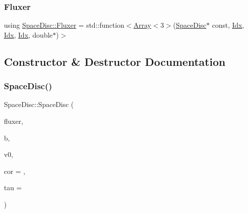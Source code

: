 \subsubsection{\texorpdfstring{Fluxer}{Fluxer}}
{\footnotesize\ttfamily using \hyperlink{structSpaceDisc_a96fbebf5dd4659e2dcc144a5debc861d}{Space\+Disc\+::\+Fluxer} =  std\+::function$<$\hyperlink{Includes_8h_abd9de33944f934950000c3929e14ad8d}{Array}$<$3$>$(\hyperlink{structSpaceDisc}{Space\+Disc}$\ast$ const, \hyperlink{Includes_8h_ae78891cd308078a2f5f9e7193065c805}{Idx}, \hyperlink{Includes_8h_ae78891cd308078a2f5f9e7193065c805}{Idx}, \hyperlink{Includes_8h_ae78891cd308078a2f5f9e7193065c805}{Idx}, double$\ast$)$>$}



\subsection{Constructor \& Destructor Documentation}
\mbox{\label{structSpaceDisc_a69bc32c19f0e0392d65463de812818e5}} 
\subsubsection{\texorpdfstring{Space\+Disc()}{SpaceDisc()}\hspace{0.1cm}{\footnotesize\ttfamily [1/2]}}
{\footnotesize\ttfamily Space\+Disc\+::\+Space\+Disc (\begin{DoxyParamCaption}\item[{const \hyperlink{structSpaceDisc_a96fbebf5dd4659e2dcc144a5debc861d}{Fluxer} \&}]{fluxer,  }\item[{\hyperlink{structBathymetry}{Bathymetry} \&\&}]{b,  }\item[{const \hyperlink{ValueField_8h_a329043a10c46a8722ea79ba24fe40f97}{Volume\+Field} \&}]{v0,  }\item[{double}]{cor = {},  }\item[{double}]{tau = {} }\end{DoxyParamCaption})}

\mbox{\label{structSpaceDisc_a3bc2b6463824bfb7f43235dec457f1ce}} 
